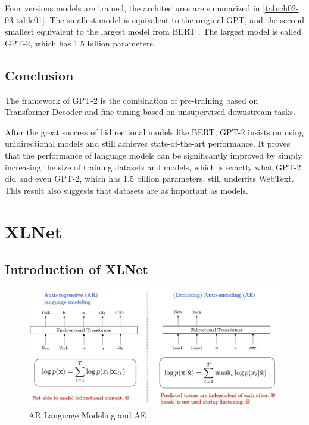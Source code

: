 \documentclass[]{krantz}
\begin{document}
Four versions models are trained, the architectures are summarized in \ref{tab:ch02-03-table01}. The smallest model is equivalent to the original GPT, and the second smallest equivalent to the largest model from BERT \citet{bert}. The largest model is called GPT-2, which has 1.5 billion parameters.

\hypertarget{conclusion}{%
\subsection{Conclusion}\label{conclusion}}

The framework of GPT-2 is the combination of pre-training based on Transformer Decoder and fine-tuning based on unsupervised downstream tasks.

After the great success of bidirectional models like BERT, GPT-2 insists on using unidirectional models and still achieves state-of-the-art performance. It proves that the performance of language models can be significantly improved by simply increasing the size of training datasets and models, which is exactly what GPT-2 did and even GPT-2, which has 1.5 billion parameters, still underfits WebText. This result also suggests that datasets are as important as models.

\hypertarget{xlnet}{%
\section{XLNet}\label{xlnet}}

\hypertarget{introduction-of-xlnet}{%
\subsection{Introduction of XLNet}\label{introduction-of-xlnet}}

\begin{figure}

{\centering \includegraphics[width=0.9\linewidth]{figures/02-03-transfer-learning-for-nlp/xlnet_twomodels} 

}

\caption{AR Language Modeling  and AE}\label{fig:ch02-03-figure09}
\end{figure}
\end{document}
